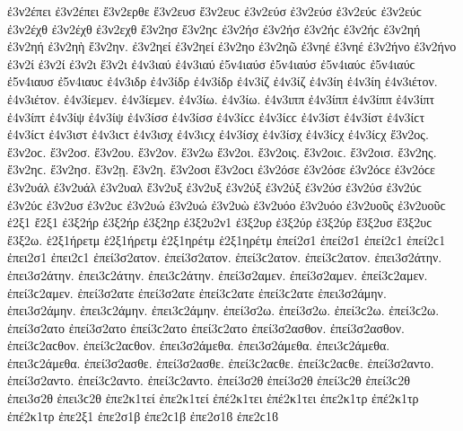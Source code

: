{ἐ3ν2έπει ἐ3ν2έπει
ἔ3ν2ερθε   %
ἔ3ν2ευσ ἔ3ν2ευϲ   %
ἐ3ν2εύσ ἐ3ν2εύσ ἐ3ν2εύϲ ἐ3ν2εύϲ   %
ἐ3ν2έχθ ἐ3ν2έχθ   %
ἐ3ν2εχθ
ἔ3ν2ησ ἔ3ν2ηϲ   %
ἐ3ν2ήσ ἐ3ν2ήσ ἐ3ν2ήϲ ἐ3ν2ήϲ
ἐ3ν2ηή ἐ3ν2ηή   %
ἐ3ν2ηὴ
ἔ3ν2ην.   %
ἐ3ν2ηεί ἐ3ν2ηεί   %
ἐ3ν2ηο
ἐ3ν2ηῶ
ἐ3νηέ ἐ3νηέ
ἐ3ν2ήνο ἐ3ν2ήνο   %
ἐ3ν2ί ἐ3ν2ί
ἐ3ν2ι
ἔ3ν2ι
ἐ4ν3ιαύ ἐ4ν3ιαύ   %
ἐ5ν4ιαύσ ἐ5ν4ιαύσ ἐ5ν4ιαύϲ ἐ5ν4ιαύϲ   %
ἐ5ν4ιαυσ ἐ5ν4ιαυϲ
ἐ4ν3ιδρ   %
ἐ4ν3ίδρ ἐ4ν3ίδρ   %
ἐ4ν3ίζ ἐ4ν3ίζ   %
ἐ4ν3ίη ἐ4ν3ίη   %
ἐ4ν3ιέτον. ἐ4ν3ιέτον.
ἐ4ν3ίεμεν. ἐ4ν3ίεμεν.
ἐ4ν3ίω. ἐ4ν3ίω.
ἐ4ν3ιππ   %
ἐ4ν3ίππ ἐ4ν3ίππ   %
ἐ4ν3ίπτ ἐ4ν3ίπτ   %
ἐ4ν3ίψ ἐ4ν3ίψ
ἐ4ν3ίσσ ἐ4ν3ίσσ ἐ4ν3ίϲϲ ἐ4ν3ίϲϲ   %
ἐ4ν3ίστ ἐ4ν3ίστ ἐ4ν3ίϲτ ἐ4ν3ίϲτ   %
ἐ4ν3ιστ ἐ4ν3ιϲτ
ἐ4ν3ισχ ἐ4ν3ιϲχ   %
ἐ4ν3ίσχ ἐ4ν3ίσχ ἐ4ν3ίϲχ ἐ4ν3ίϲχ   %
ἔ3ν2ος. ἔ3ν2οϲ.   %
ἔ3ν2οσ.
ἔ3ν2ου.
ἔ3ν2ον.
ἔ3ν2ω
ἔ3ν2οι.
ἔ3ν2οις. ἔ3ν2οιϲ.
ἔ3ν2οισ.
ἔ3ν2ης. ἔ3ν2ηϲ.
ἔ3ν2ησ.
ἔ3ν2ῃ.
ἔ3ν2η.
ἔ3ν2οσι ἔ3ν2οϲι   %
ἐ3ν2όσε ἐ3ν2όσε ἐ3ν2όϲε ἐ3ν2όϲε
ἐ3ν2υάλ ἐ3ν2υάλ   %
ἐ3ν2υαλ
ἔ3ν2υξ   %
ἐ3ν2υξ   %
ἐ3ν2ύξ ἐ3ν2ύξ   %
ἐ3ν2ύσ ἐ3ν2ύσ ἐ3ν2ύϲ ἐ3ν2ύϲ   %
ἐ3ν2υσ ἐ3ν2υϲ
ἐ3ν2υώ ἐ3ν2υώ   %
ἐ3ν2υὼ
ἐ3ν2υόο ἐ3ν2υόο
ἐ3ν2υοῦς ἐ3ν2υοῦϲ
ἐ2ξ1
ἔ2ξ1
ἐ3ξ2ήρ ἐ3ξ2ήρ   %
ἐ3ξ2ηρ   %
ἐ3ξ2υ2ν1   %
ἐ3ξ2υρ   %
ἐ3ξ2ύρ ἐ3ξ2ύρ   %
ἔ3ξ2υσ ἔ3ξ2υϲ   %
ἔ3ξ2ω.
ἑ2ξ1ήρετμ ἑ2ξ1ήρετμ   %
ἑ2ξ1ηρέτμ ἑ2ξ1ηρέτμ
ἐπεί2σ1 ἐπεί2σ1 ἐπεί2ϲ1 ἐπεί2ϲ1   %
ἐπει2σ1 ἐπει2ϲ1
ἐπεί3σ2ατον. ἐπεί3σ2ατον. ἐπεί3ϲ2ατον. ἐπεί3ϲ2ατον.   %
ἐπει3σ2άτην. ἐπει3σ2άτην. ἐπει3ϲ2άτην. ἐπει3ϲ2άτην.
ἐπεί3σ2αμεν. ἐπεί3σ2αμεν. ἐπεί3ϲ2αμεν. ἐπεί3ϲ2αμεν.
ἐπεί3σ2ατε ἐπεί3σ2ατε ἐπεί3ϲ2ατε ἐπεί3ϲ2ατε
ἐπει3σ2άμην. ἐπει3σ2άμην. ἐπει3ϲ2άμην. ἐπει3ϲ2άμην.
ἐπεί3σ2ω. ἐπεί3σ2ω. ἐπεί3ϲ2ω. ἐπεί3ϲ2ω.
ἐπεί3σ2ατο ἐπεί3σ2ατο ἐπεί3ϲ2ατο ἐπεί3ϲ2ατο
ἐπεί3σ2ασθον. ἐπεί3σ2ασθον. ἐπεί3ϲ2αϲθον. ἐπεί3ϲ2αϲθον.
ἐπει3σ2άμεθα. ἐπει3σ2άμεθα. ἐπει3ϲ2άμεθα. ἐπει3ϲ2άμεθα.
ἐπεί3σ2ασθε. ἐπεί3σ2ασθε. ἐπεί3ϲ2αϲθε. ἐπεί3ϲ2αϲθε.
ἐπεί3σ2αντο. ἐπεί3σ2αντο. ἐπεί3ϲ2αντο. ἐπεί3ϲ2αντο.
ἐπεί3σ2θ ἐπεί3σ2θ ἐπεί3ϲ2θ ἐπεί3ϲ2θ   %
ἐπει3σ2θ ἐπει3ϲ2θ
ἐπε2κ1τεί ἐπε2κ1τεί   %
ἐπέ2κ1τει ἐπέ2κ1τει
ἐπε2κ1τρ   %
ἐπέ2κ1τρ ἐπέ2κ1τρ
ἐπε2ξ1
ἐπε2σ1β ἐπε2ϲ1β ἐπε2σ1ϐ ἐπε2ϲ1ϐ %
}
